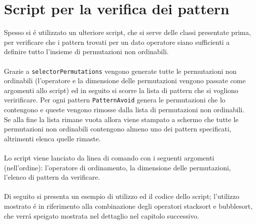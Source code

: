 \section*{Script per la verifica dei pattern}
Spesso si \'e utilizzato un ulteriore script, che si serve delle classi presentate prima, per verificare che i pattern trovati per un dato operatore siano sufficienti a definire tutto l'insieme di permutazioni non ordinabili.\\\\
Grazie a \texttt{selectorPermutations} vengono generate tutte le permutazioni non ordinabili (l'operatore e la dimensione delle permutazioni vengono passate come argomenti allo script) ed in seguito si scorre la lista di pattern che si vogliono veririficare. Per ogni pattern \texttt{PatternAvoid} genera le permutazioni che lo contengono e queste vengono rimosse dalla lista di permutazioni non ordinabili. Se alla fine la lista rimane vuota allora viene stampato a schermo che tutte le permutazioni non ordinabili contengono almeno uno dei pattern specificati, altrimenti elenca quelle rimaste.\\\\
Lo script viene lanciato da linea di comando con i seguenti argomenti (nell'ordine): l'operatore di ordinamento, la dimensione delle permutazioni, l'elenco di pattern da verificare.\\\\
Di seguito si presenta un esempio di utilizzo ed il codice dello script; l'utilizzo mostrato \'e in riferimento alla combinazione degli operatori stacksort e bubblesort, che verr\'a speigato mostrata nel dettaglio nel capitolo successivo.\\


